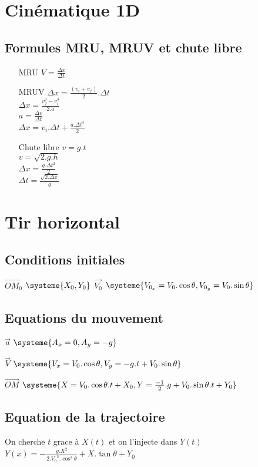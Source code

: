 \documentclass[a4paper, 12pt]{article}
\begin{document}
\section*{Cinématique 1D}
\subsection*{Formules MRU, MRUV et chute libre}
\begin{enumerate}
\item[MRU]
$V=\frac{\Delta x}{\Delta t}$
\item[MRUV]
$\Delta x = \frac{(v_i+v_f)}{2}.\Delta t$\\
$\Delta x = \frac{v^2_f - v^2_i}{2.a}$\\
$a = \frac{\Delta v}{\Delta t}$\\
$\Delta x = v_i . \Delta t + \frac{a.\Delta t^2}{2}$
\item[Chute libre]
$v = g.t$\\
$v=\sqrt{2.g.h}$\\
$\Delta x = \frac{g.\Delta t^2}{2}$\\
$\Delta t = \frac{\sqrt{2.\Delta x}}{g}$
\end{enumerate}
\section*{Tir horizontal}

\subsection*{Conditions initiales}
$\overrightarrow{OM_0}$ 
$\systeme{
X_0,
Y_0
}$    
\qquad\qquad $\overrightarrow{V_0}$ 
$\systeme{
V_{0_x} = V_0 . \cos\theta,
V_{0_y} = V_0 . \sin\theta
}$

\subsection*{Equations du mouvement}
$\overrightarrow{a}$
$\systeme{
A_x = 0,
A_y = -g
}$

$\overrightarrow{V}$
$\systeme{
V_x =V_0 . \cos \theta,
V_y =- g . t + V_0 . \sin \theta
}$

$\overrightarrow{OM}$
$\systeme{
X = V_0 . \cos \theta . t + X_0,
Y = \frac{-1}{2} . g + V_0 . \sin \theta . t + Y_0
}$

\subsection*{Equation de la trajectoire}
On cherche $t$ grace à $X(t)$ et on l'injecte dans $Y(t)$\\
$Y(x) = -\frac{g . X^2}{2 . {V_0}^2 . \cos^2 \theta} + X . \tan \theta + Y_0
$
\end{document}
